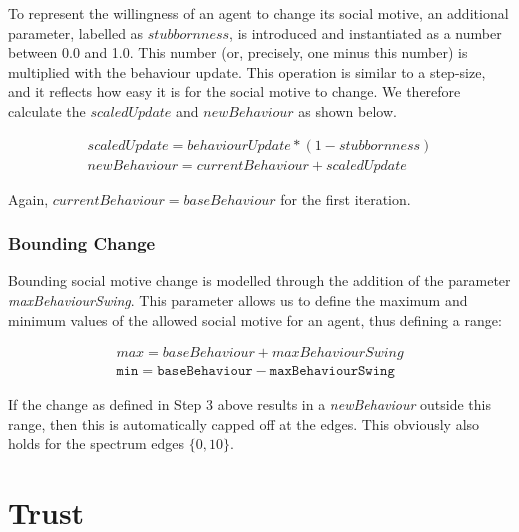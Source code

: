 To represent the willingness of an agent to change its social motive, an additional parameter, labelled as $stubbornness$, is introduced and instantiated as a number between 0.0 and 1.0. This number (or, precisely, one minus this number) is multiplied with the behaviour update. This operation is similar to a step-size, and it reflects how easy it is for the social motive to change. We therefore calculate the $scaledUpdate$ and $newBehaviour$ as shown below.


\begin{equation}
    \begin{gathered}
    scaledUpdate = behaviourUpdate *(1-stubbornness) \\ 
    newBehaviour = currentBehaviour + scaledUpdate
    \end{gathered}
\end{equation}


Again, $currentBehaviour=baseBehaviour$ for the first iteration.

\subsubsection{Bounding Change}

Bounding social motive change is modelled through the addition of the parameter \textit{maxBehaviourSwing}. This parameter allows us to define the maximum and minimum values of the allowed social motive for an agent, thus defining a range:

\vspace{0.2cm}
\begin{equation}
    \begin{gathered}
    max=baseBehaviour+maxBehaviourSwing  \\ 
    \texttt{min}=\texttt{baseBehaviour}-\texttt{maxBehaviourSwing }
    \end{gathered}
\end{equation}
\vspace{0.2cm}

If the change as defined in Step 3 above results in a \textit{newBehaviour} outside this range, then this is automatically capped off at the edges. This obviously also holds for the spectrum edges $\{0,10\}$.


\section{Trust}

